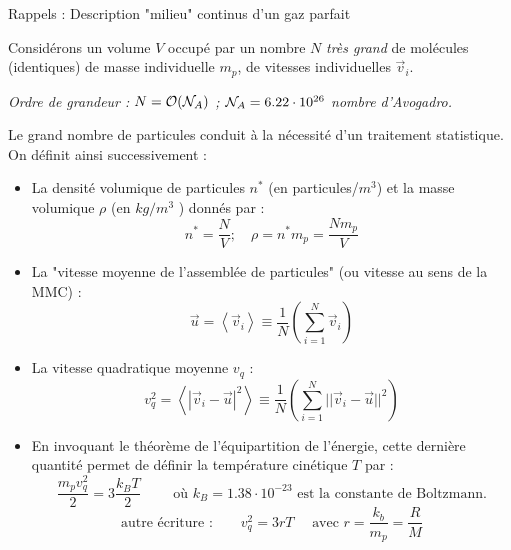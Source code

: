 \begin{frame}{Rappels : Description "milieu" continus d'un gaz parfait}

\small

Considérons un volume $V$ occupé par un nombre $N$ {\em très grand} de molécules (identiques) de masse individuelle $m_p$, de vitesses individuelles $\vec{v}_i$.

\pause 

{\em Ordre de grandeur : 
$N = {\cal O}({\cal N}_A)$ ; ${\cal N}_A = 6.22 \cdot 10^{26} $ nombre d'Avogadro.
}

\smallskip


Le grand nombre de particules conduit à la nécessité d'un traitement statistique. On définit ainsi successivement :
\pause

\begin{itemize}

\item La densité volumique de particules $n^*$ (en particules/$m^3$) et la masse volumique $\rho$ 
(en $kg/m^3$ )
donnés par :
$$ n^* = \frac{N}{V} ; \quad \rho = n^* m_p = \frac{N m_p}{V} %
$$
\pause


\item La "vitesse moyenne de l'assemblée de particules" (ou vitesse au sens de la MMC) :
$$
\vec u = \left< \vec{v}_i \right> \equiv \frac{1}{N} \left(\sum\limits_{i=1}^N \vec{v}_i \right) 
$$
\pause
\item La vitesse quadratique moyenne $v_q$ :
$$
v_q^2 = \left< |\vec{v}_i-\vec{u}|^2 \right>   \equiv \frac{1}{N} \left(\sum\limits_{i=1}^N || \vec{v}_i-\vec{u}||^2  \right) 
$$
\pause
\item En invoquant le théorème de l'équipartition de l'énergie, cette dernière quantité permet de définir la température cinétique $T$ par :
$$
\frac{m_p v_q^2}{2} = 3 \frac{k_B T}{2} \qquad \mbox{ où } k_B = 1.38 \cdot 10^{-23}
\mbox{ est la constante de Boltzmann.}
$$
\pause 
$$\mbox{autre écriture :} \qquad v_q^2 = 3 r T \quad \mbox{ avec } r = \frac{k_b}{m_p} = \frac{R}{M}
$$
\end{itemize}

\end{frame}
 
